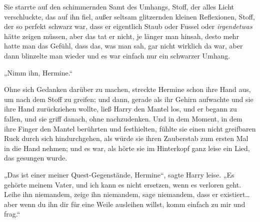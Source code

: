 Sie starrte auf den schimmernden Samt des Umhangs, Stoff, der alles Licht verschluckte, das auf ihn fiel, außer seltsam glitzernden kleinen Reflexionen, Stoff, der so perfekt schwarz war, dass er eigentlich Staub oder Fussel oder \emph{irgendetwas} hätte zeigen müssen, aber das tat er nicht, je länger man hinsah, desto mehr hatte man das Gefühl, dass das, was man sah, gar nicht wirklich da war, aber dann blinzelte man wieder und es war einfach nur ein schwarzer Umhang.

„Nimm ihn, Hermine.“

Ohne sich Gedanken darüber zu machen, streckte Hermine schon ihre Hand aus, um nach dem Stoff zu greifen; und dann, gerade als ihr Gehirn aufwachte und sie ihre Hand zurückziehen wollte, ließ Harry den Mantel los, und er begann zu fallen, und sie griff danach, ohne nachzudenken. Und in dem Moment, in dem ihre Finger den Mantel berührten und festhielten, fühlte sie einen nicht greifbaren Ruck durch sich hindurchgehen, als würde sie ihren Zauberstab zum ersten Mal in die Hand nehmen; und es war, als hörte sie im Hinterkopf ganz leise ein Lied, das gesungen wurde.

„Das ist einer meiner Quest-Gegenstände, Hermine“, sagte Harry leise. „Es gehörte meinem Vater, und ich kann es nicht ersetzen, wenn es verloren geht. Leihe ihn niemandem, zeige ihn niemandem, sage niemandem, dass er existiert…aber wenn du ihn dir für eine Weile ausleihen willst, komm einfach zu mir und frag.“

